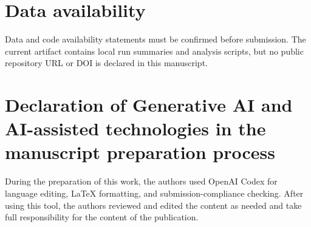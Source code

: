 \documentclass[final,5p,times,number]{elsarticle}
\begin{document}
\section*{Data availability}
Data and code availability statements must be confirmed before submission. The current artifact contains local run summaries and analysis scripts, but no public repository URL or DOI is declared in this manuscript.

\section*{Declaration of Generative AI and AI-assisted technologies in the manuscript preparation process}
During the preparation of this work, the authors used OpenAI Codex for language editing, LaTeX formatting, and submission-compliance checking. After using this tool, the authors reviewed and edited the content as needed and take full responsibility for the content of the publication.

\setlength{\bibsep}{0pt}


\end{document}
